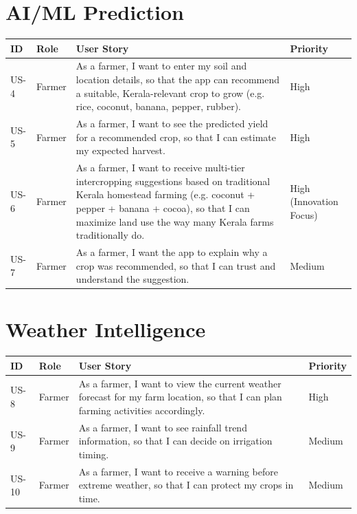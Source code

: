 \documentclass[12pt,a4paper]{article}
\begin{document}
\section{AI/ML Prediction}
\begin{longtable}{p{1.3cm} p{1.6cm} p{9.3cm} p{1.5cm}}
\toprule
\textbf{ID} & \textbf{Role} & \textbf{User Story} & \textbf{Priority} \\
\midrule
\endhead
US-4 & Farmer & As a farmer, I want to enter my soil and location details, so that the app can recommend a suitable, Kerala-relevant crop to grow (e.g. rice, coconut, banana, pepper, rubber). & High \\
US-5 & Farmer & As a farmer, I want to see the predicted yield for a recommended crop, so that I can estimate my expected harvest. & High \\
US-6 & Farmer & As a farmer, I want to receive multi-tier intercropping suggestions based on traditional Kerala homestead farming (e.g. coconut + pepper + banana + cocoa), so that I can maximize land use the way many Kerala farms traditionally do. & High (Innovation Focus) \\
US-7 & Farmer & As a farmer, I want the app to explain why a crop was recommended, so that I can trust and understand the suggestion. & Medium \\
\bottomrule
\end{longtable}

\section{Weather Intelligence}
\begin{longtable}{p{1.3cm} p{1.6cm} p{9.3cm} p{1.5cm}}
\toprule
\textbf{ID} & \textbf{Role} & \textbf{User Story} & \textbf{Priority} \\
\midrule
\endhead
US-8 & Farmer & As a farmer, I want to view the current weather forecast for my farm location, so that I can plan farming activities accordingly. & High \\
US-9 & Farmer & As a farmer, I want to see rainfall trend information, so that I can decide on irrigation timing. & Medium \\
US-10 & Farmer & As a farmer, I want to receive a warning before extreme weather, so that I can protect my crops in time. & Medium \\
\bottomrule
\end{longtable}

\end{document}
